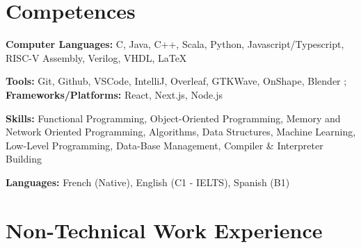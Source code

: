 \documentclass[a4paper, 10pt]{article}
\newenvironment{highlights}{
    \begin{itemize}[
        topsep=0.10 cm,
        parsep=0.10 cm,
        partopsep=0pt,
        itemsep=0pt,
        leftmargin=0.4 cm + 10pt
    ]
}{
    \end{itemize}
} %
\let\hrefWithoutArrow\href
\renewcommand{\href}[2]{\hrefWithoutArrow{#1}{\ifthenelse{\equal{#2}{}}{ }{#2 }\raisebox{.15ex}{\footnotesize \faExternalLink*}}}
\begin{document}



        
        
    
    \section{Competences}
    \textbf{Computer Languages:} C, Java, C++, Scala, Python, Javascript/Typescript, RISC-V Assembly, Verilog, VHDL, LaTeX
    
    \vspace{0.2 cm}
    
    \textbf{Tools:} Git, Github, VSCode, IntelliJ, Overleaf, GTKWave, OnShape, Blender ; \textbf{Frameworks/Platforms:} React, Next.js, Node.js
    
    \vspace{0.2cm}
    
    \textbf{Skills:} Functional Programming, Object-Oriented Programming, Memory and Network Oriented Programming, Algorithms, Data Structures, Machine Learning, Low-Level Programming, Data-Base Management, Compiler \& Interpreter Building
    
    \vspace{0.2cm}

    \textbf{Languages:} French (Native), English (C1 - IELTS\href{https://drive.google.com/file/d/18yDkgZtQfjBlhffuau9RirNduw-D5SH6/view?usp=sharing}{}), Spanish (B1)
    
    
    \section{Non-Technical Work Experience}
    
\end{document}
